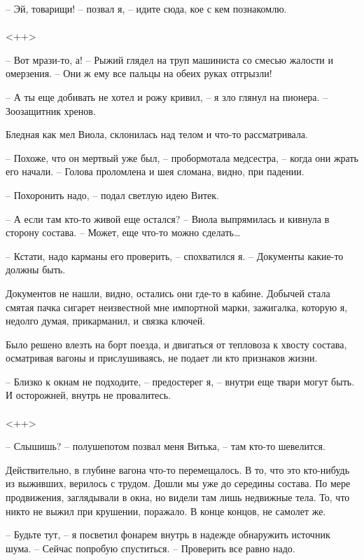 \documentclass[a4paper]{book}
\begin{document}
-- Эй, товарищи! -- позвал я, -- идите сюда, кое с кем познакомлю. 

\paragraph{}<++>

-- Вот мрази-то, а! -- Рыжий глядел на труп машиниста со смесью жалости и омерзения. -- Они ж ему все пальцы на обеих руках отгрызли!

-- А ты еще добивать не хотел и рожу кривил, -- я зло глянул на пионера. -- Зоозащитник хренов. 

Бледная как мел Виола, склонилась над телом и что-то рассматривала. 

-- Похоже, что он мертвый уже был, -- пробормотала медсестра, -- когда они жрать его начали. -- Голова проломлена и шея сломана, видно, при падении. 

-- Похоронить  надо, -- подал светлую идею Витек.

-- А если там кто-то живой еще остался? -- Виола выпрямилась и кивнула в сторону состава. -- Может, еще что-то можно сделать\ldots

-- Кстати, надо карманы его проверить, -- спохватился я. -- Документы какие-то должны быть. 

Документов не нашли, видно, остались они где-то в кабине. Добычей стала смятая пачка сигарет неизвестной мне импортной марки, зажигалка, которую я, недолго думая, прикарманил, и связка ключей. 

Было решено влезть на борт поезда, и двигаться от тепловоза к хвосту состава, осматривая вагоны и прислушиваясь, не подает ли кто признаков жизни.

-- Близко к окнам не подходите, -- предостерег я, -- внутри еще твари могут быть. И осторожней, внутрь не провалитесь.

\paragraph{}<++>

-- Слышишь? -- полушепотом позвал меня Витька, -- там кто-то шевелится.

Действительно, в глубине вагона что-то перемещалось. В то, что это кто-нибудь из выживших, верилось с трудом. Дошли мы уже до середины состава. По мере продвижения, заглядывали в окна, но видели там лишь недвижные тела. То, что никто не выжил при крушении, поражало. В конце концов, не самолет же.

-- Будьте тут, -- я посветил фонарем внутрь в надежде обнаружить источник шума. -- Сейчас попробую спуститься. --  Проверить все равно надо.
\end{document}
